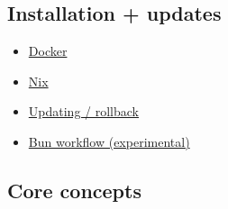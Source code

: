 \subsection{Installation + updates}


\begin{itemize}
  \item \href{/install/docker}{Docker}
  \item \href{/install/nix}{Nix}
  \item \href{/install/updating}{Updating / rollback}
  \item \href{/install/bun}{Bun workflow (experimental)}
\end{itemize}


\subsection{Core concepts}


